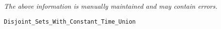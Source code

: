 \label{pkg:disjoint\_sets\_with\_constant\_time\_union}

{\tiny \it The above information is manually maintained and may contain errors.}
\begin{verbatim}
Disjoint_Sets_With_Constant_Time_Union
\end{verbatim}
